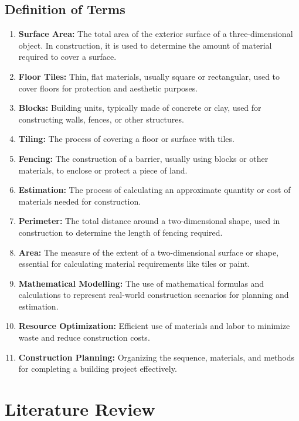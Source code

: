 \documentclass[12pt,a4paper,openany,titlepage,reqno, final]{report}
\theoremstyle{definition}
\begin{document}
	\section{Definition of Terms}
\begin{enumerate}
	\item \textbf{Surface Area:} The total area of the exterior surface of a three-dimensional object. In construction, it is used to determine the amount of material required to cover a surface.
	\item \textbf{Floor Tiles:} Thin, flat materials, usually square or rectangular, used to cover floors for protection and aesthetic purposes.
	\item \textbf{Blocks:} Building units, typically made of concrete or clay, used for constructing walls, fences, or other structures.
	\item \textbf{Tiling:} The process of covering a floor or surface with tiles.
	\item \textbf{Fencing:} The construction of a barrier, usually using blocks or other materials, to enclose or protect a piece of land.
	\item \textbf{Estimation:} The process of calculating an approximate quantity or cost of materials needed for construction.
	\item \textbf{Perimeter:} The total distance around a two-dimensional shape, used in construction to determine the length of fencing required.
	\item \textbf{Area:} The measure of the extent of a two-dimensional surface or shape, essential for calculating material requirements like tiles or paint.
	\item \textbf{Mathematical Modelling:} The use of mathematical formulas and calculations to represent real-world construction scenarios for planning and estimation.
	\item \textbf{Resource Optimization:} Efficient use of materials and labor to minimize waste and reduce construction costs.
	\item \textbf{Construction Planning:} Organizing the sequence, materials, and methods for completing a building project effectively.
\end{enumerate}
		\chapter{Literature Review}
	
\end{document}

